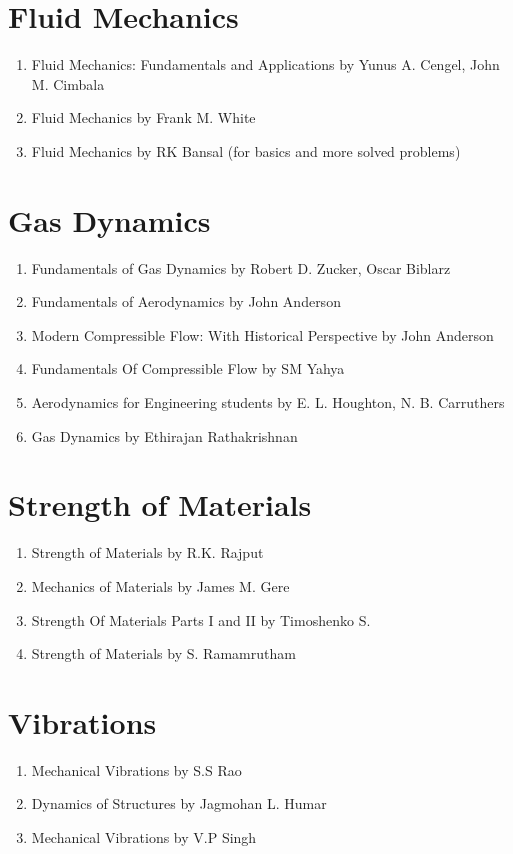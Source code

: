\section{Fluid Mechanics}
\begin{enumerate}
  \item Fluid Mechanics: Fundamentals and Applications by Yunus A. Cengel, John M. Cimbala
  \item Fluid Mechanics by Frank M. White
  \item Fluid Mechanics by RK Bansal (for basics and more solved problems)
\end{enumerate}

\section{Gas Dynamics}
\begin{enumerate}
  \item Fundamentals of Gas Dynamics by Robert D. Zucker, Oscar Biblarz
  \item Fundamentals of Aerodynamics by John Anderson
  \item Modern Compressible Flow: With Historical Perspective by John Anderson
  \item Fundamentals Of Compressible Flow by SM Yahya
  \item Aerodynamics for Engineering students by E. L. Houghton, N. B. Carruthers
  \item Gas Dynamics by Ethirajan Rathakrishnan
\end{enumerate}

\section{Strength of Materials}
\begin{enumerate}
  \item Strength of Materials by R.K. Rajput
  \item Mechanics of Materials by James M. Gere
  \item Strength Of Materials Parts I and II by Timoshenko S.
  \item Strength of Materials by S. Ramamrutham
\end{enumerate}

\section{Vibrations}
\begin{enumerate}
  \item Mechanical Vibrations by S.S Rao
  \item Dynamics of Structures by Jagmohan L. Humar
  \item Mechanical Vibrations by V.P Singh
\end{enumerate}

